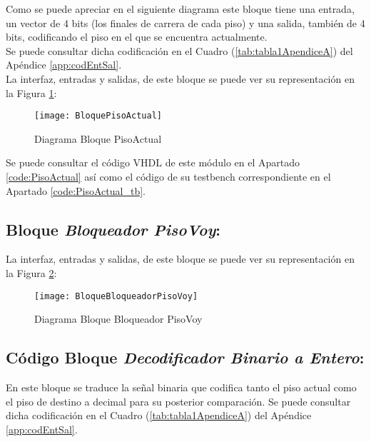     Como se puede apreciar en el siguiente diagrama este bloque tiene una entrada, un vector de 4 bits (los finales de carrera de cada piso) y una salida, también de 4 bits, codificando el piso en el que se encuentra actualmente. \\ 
    
    Se puede consultar dicha codificación en el Cuadro (\ref{tab:tabla1ApendiceA}) del Apéndice \ref{app:codEntSal}. \\ 
    
    La interfaz, entradas y salidas, de este bloque se puede ver su representación en la Figura \ref{fig:BloquePisoActual}:
    
    \begin{figure}[H]
		    \centering
		    \hspace*{-1.8cm}
		    \texttt{[image: BloquePisoActual]}
		    \caption{Diagrama Bloque PisoActual}
		    \label{fig:BloquePisoActual}
	\end{figure}
	
	Se puede consultar el código VHDL de este módulo en el Apartado \ref{code:PisoActual} así como el código de su testbench correspondiente en el Apartado \ref{code:PisoActual_tb}.

\subsection{Bloque \textit{Bloqueador PisoVoy}:}
    
    La interfaz, entradas y salidas, de este bloque se puede ver su representación en la Figura \ref{fig:BloqueBloqueadorPisoVoy}:
    
    
    \begin{figure}[H]
		    \centering
		    \hspace*{-1.8cm}
		    \texttt{[image: BloqueBloqueadorPisoVoy]}
		    \caption{Diagrama Bloque Bloqueador PisoVoy}
		    \label{fig:BloqueBloqueadorPisoVoy}
	\end{figure}
	
\subsection{Código Bloque \textit{Decodificador Binario a Entero}:} \label{bloque:DecodificadorBinarioEntero}
	En este bloque se traduce la señal binaria que codifica tanto el piso actual como el piso de destino a decimal para su posterior comparación.
	Se puede consultar dicha codificación en el Cuadro (\ref{tab:tabla1ApendiceA}) del Apéndice \ref{app:codEntSal}. \\ 
	
